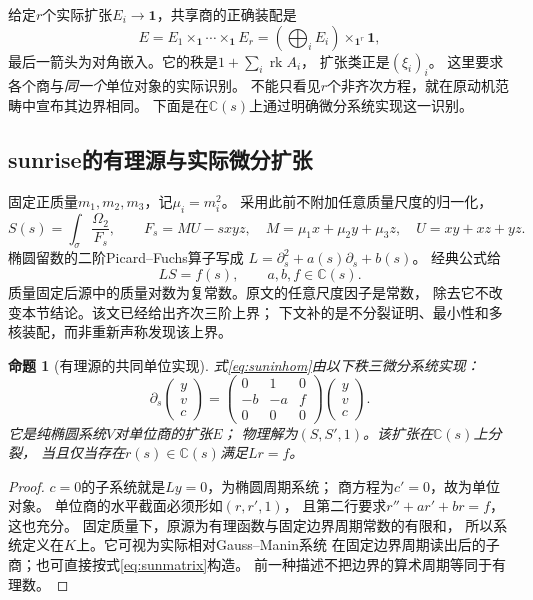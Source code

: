 \documentclass[11pt,a4paper]{ctexart}
\theoremstyle{cnplain}\newtheorem{theorem}{定理}[section]
\newtheorem{proposition}[theorem]{命题}
\theoremstyle{definition}\newtheorem{definition}[theorem]{定义}
\theoremstyle{remark}\newtheorem{remark}[theorem]{注}
\newcommand{\rk}{\operatorname{rk}}\newcommand{\im}{\operatorname{im}}
\begin{document}
给定$r$个实际扩张$E_i\to\mathbf1$，共享商的正确装配是
\[
 E=E_1\times_{\mathbf1}\cdots\times_{\mathbf1}E_r
 =(\bigoplus_iE_i)\times_{\mathbf1^r}\mathbf1 ,
\]
最后一箭头为对角嵌入。它的秩是$1+\sum_i\rk A_i$，
扩张类正是$(\xi_i)_i$。
这里要求各个商与\emph{同一个}单位对象的实际识别。
不能只看见$r$个非齐次方程，就在原动机范畴中宣布其边界相同。
下面是在$\mathbb C(s)$上通过明确微分系统实现这一识别。

\subsection{sunrise的有理源与实际微分扩张}
固定正质量$m_1,m_2,m_3$，记$\mu_i=m_i^2$。
采用此前不附加任意质量尺度的归一化，
\[
 S(s)=\int_{\sigma}
 \frac{\Omega_2}{F_s},\qquad
 F_s=M U-sxyz,\quad
 M=\mu_1x+\mu_2y+\mu_3z,\quad U=xy+xz+yz .
\]
椭圆留数的二阶Picard--Fuchs算子写成
$L=\partial_s^2+a(s)\partial_s+b(s)$。
经典公式\cite[\S4,式(37)--(43)]{ABWsun}给
\begin{equation}\label{eq:suninhom}
 LS=f(s),\qquad a,b,f\in\mathbb C(s).
\end{equation}
质量固定后源中的质量对数为复常数。原文的任意尺度因子是常数，
除去它不改变本节结论。该文已经给出齐次三阶上界；
下文补的是不分裂证明、最小性和多核装配，而非重新声称发现该上界。

\begin{proposition}[有理源的共同单位实现]\label{prop:sunextension}
式\eqref{eq:suninhom}由以下秩三微分系统实现：
\begin{equation}\label{eq:sunmatrix}
 \partial_s
 \begin{pmatrix}y\\v\\c\end{pmatrix}
 =
 \begin{pmatrix}0&1&0\\-b&-a&f\\0&0&0\end{pmatrix}
 \begin{pmatrix}y\\v\\c\end{pmatrix}.
\end{equation}
它是纯椭圆系统$V$对单位商的扩张$E$；
物理解为$(S,S',1)$。该扩张在$\mathbb C(s)$上分裂，
当且仅当存在$r(s)\in\mathbb C(s)$满足$Lr=f$。
\end{proposition}
\begin{proof}
$c=0$的子系统就是$Ly=0$，为椭圆周期系统；
商方程为$c'=0$，故为单位对象。
单位商的水平截面必须形如$(r,r',1)$，
且第二行要求$r''+ar'+br=f$，这也充分。
固定质量下，原源为有理函数与固定边界周期常数的有限和，
所以系统定义在$K$上。它可视为实际相对Gauss--Manin系统
在固定边界周期读出后的子商；也可直接按式\eqref{eq:sunmatrix}构造。
前一种描述不把边界的算术周期等同于有理数。
\end{proof}
\end{document}
